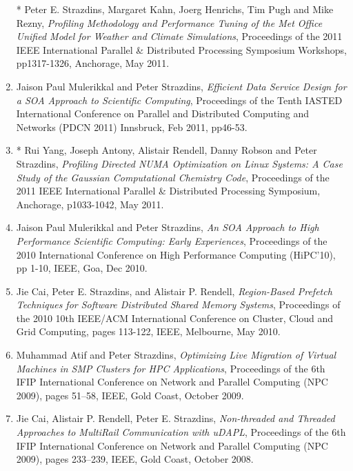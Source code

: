 \documentclass[a4paper,oneside,12pt]{article}
\begin{document}
\begin{enumerate}
  * Peter E. Strazdins, Margaret Kahn, Joerg Henrichs, Tim Pugh and Mike
  Rezny, {\em Profiling Methodology and Performance Tuning of the Met           
    Office Unified Model for Weather and Climate Simulations},
  Proceedings of the 2011 IEEE International Parallel \& Distributed
  Processing Symposium Workshops, pp1317-1326, Anchorage, May 2011.


\item Jaison Paul Mulerikkal and Peter Strazdins,
{\em Efficient Data Service Design for a SOA Approach to Scientific Computing},
Proceedings of the Tenth IASTED International Conference on
Parallel and Distributed Computing and Networks (PDCN 2011)
Innsbruck, Feb 2011, pp46-53.


\item * Rui Yang, Joseph Antony, Alistair Rendell, Danny Robson and Peter Strazdins,
{\em Profiling Directed NUMA Optimization on Linux Systems: A Case              
Study of the Gaussian Computational Chemistry Code},
Proceedings of the
2011 IEEE International Parallel \& Distributed Processing Symposium,
Anchorage, p1033-1042, May 2011.

\item Jaison Paul Mulerikkal and Peter Strazdins, {\em An SOA Approach
to High Performance Scientific Computing: Early Experiences},
Proceedings of the 2010  International Conference on High Performance
Computing (HiPC'10), pp 1-10, IEEE, Goa, Dec 2010.

\item Jie Cai, Peter E. Strazdins, and Alistair P. Rendell, {\em
Region-Based Prefetch Techniques for Software Distributed Shared Memory
Systems}, Proceedings of the  2010 10th IEEE/ACM International
Conference on Cluster, Cloud and Grid Computing, pages 113-122, IEEE,
Melbourne, May 2010.

\item Muhammad Atif and Peter Strazdins, {\em Optimizing Live  
Migration of Virtual Machines in SMP Clusters for HPC Applications},
Proceedings of the 6th IFIP International Conference on Network and
Parallel Computing (NPC 2009), pages 51--58, IEEE, Gold Coast, October 2009.

\item Jie Cai, Alistair P. Rendell, Peter E. Strazdins, {\em
Non-threaded and Threaded Approaches to MultiRail Communication with
uDAPL}, Proceedings of the 6th IFIP International Conference on Network
and Parallel Computing (NPC 2009), pages 233--239, IEEE, Gold Coast,
October 2008.


\end{enumerate}
\end{document}
